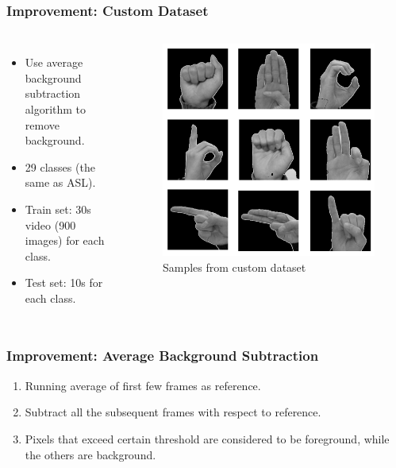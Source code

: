 \documentclass[handout]{beamer}
\begin{document}
\begin{frame}
\frametitle{Improvement: Custom Dataset}

\begin{columns}
\begin{itemize}
	\item Use average background subtraction algorithm to remove background.
	\item 29 classes (the same as ASL).
	\item Train set: 30s video (900 images) for each class.
	\item Test set: 10s for each class.
\end{itemize}


\begin{figure}
\begin{center}
\includegraphics[width=0.9\linewidth]{imgs/dataset.png}
\end{center}
\caption{Samples from custom dataset}
\end{figure}


\end{columns}


\end{frame}

\begin{frame}
\frametitle{Improvement: Average Background Subtraction}

\begin{enumerate}
	\item Running average of first few frames as reference.
	\item Subtract all the subsequent frames with respect to reference.
	\item Pixels that exceed certain threshold are considered to be foreground, while the others are background.
\end{enumerate}

\end{frame}
\end{document}
